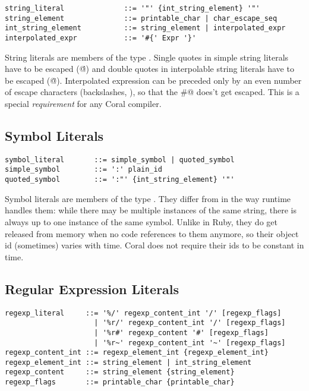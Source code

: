 \syntax\begin{lstlisting}
string_literal              ::= '"' {int_string_element} '"'
string_element              ::= printable_char | char_escape_seq
int_string_element          ::= string_element | interpolated_expr
interpolated_expr           ::= '#{' Expr '}'
\end{lstlisting}

String literals are members of the type \lstinline@String@. Single quotes in simple string literals have to be escaped (\lstinline@\'@) and double quotes in interpolable string literals have to be escaped (\lstinline@\"@). Interpolated expression can be preceded only by an even number of escape characters (backslashes, \lstinline@\@), so that the \lstinline@#@ does't get escaped. This is a special \textit{requirement} for any Coral compiler. 






\subsection{Symbol Literals}
\label{sec:symbolliterals}

\syntax\begin{lstlisting}
symbol_literal       ::= simple_symbol | quoted_symbol
simple_symbol        ::= ':' plain_id
quoted_symbol        ::= ':"' {int_string_element} '"'
\end{lstlisting}

Symbol literals are members of the type \lstinline@Symbol@. They differ from  in the way runtime handles them: while there may be multiple instances of the same string, there is always up to one instance of the same symbol. Unlike in Ruby, they do get released from memory when no code references to them anymore, so their object id (sometimes) varies with time. Coral does not require their ids to be constant in time. 









\subsection{Regular Expression Literals}\label{sec:regexpliterals}

\syntax\begin{lstlisting}
regexp_literal     ::= '%/' regexp_content_int '/' [regexp_flags]
	                 | '%r/' regexp_content_int '/' [regexp_flags]
	                 | '%r#' regexp_content '#' [regexp_flags]
	                 | '%r~' regexp_content_int '~' [regexp_flags]
regexp_content_int ::= regexp_element_int {regexp_element_int}
regexp_element_int ::= string_element | int_string_element
regexp_content     ::= string_element {string_element}
regexp_flags       ::= printable_char {printable_char}
\end{lstlisting}

